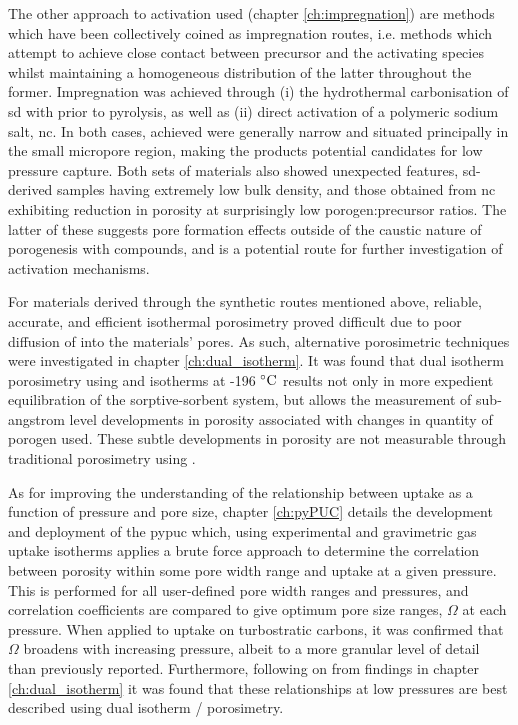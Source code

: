 The other approach to activation used (chapter \ref{ch:impregnation}) are methods which have been collectively coined as impregnation routes, i.e. methods which attempt to achieve close contact between precursor and the activating species whilst maintaining a homogeneous distribution of the latter throughout the former. Impregnation was achieved through (i) the hydrothermal carbonisation of \acrfull{sd} with  prior to pyrolysis, as well as (ii) direct activation of a polymeric sodium salt, \acrfull{nc}. In both cases,  achieved were generally narrow and situated principally in the small \gls{micropore} region, making the products potential candidates for low pressure  capture. Both sets of materials also showed unexpected features, \acrshort{sd}-derived samples having extremely low bulk density, and those obtained from \acrshort{nc} exhibiting reduction in porosity at surprisingly low \gls{porogen}:precursor ratios. The latter of these suggests pore formation effects outside of the caustic nature of \gls{porogenesis} with  compounds, and is a potential route for further investigation of \gls{activation} mechanisms.

For materials derived through the synthetic routes mentioned above, reliable, accurate, and efficient isothermal porosimetry proved difficult due to poor diffusion of  into the materials' pores. As such, alternative porosimetric techniques were investigated in chapter \ref{ch:dual_isotherm}. It was found that dual isotherm porosimetry using  and  isotherms at -196 $\rm ^{\circ}C$ results not only in more expedient equilibration of the sorptive-sorbent system, but allows the measurement of sub-angstrom level developments in porosity associated with changes in quantity of \gls{porogen} used. These subtle developments in porosity are not measurable through traditional porosimetry using . 

As for improving the understanding of the relationship between  uptake as a function of pressure and pore size, chapter \ref{ch:pyPUC} details the development and deployment of the \acrfull{pypuc} which, using experimental  and gravimetric gas uptake isotherms applies a brute force approach to determine the correlation between porosity within some pore width range and  uptake at a given pressure. This is performed for all user-defined pore width ranges and pressures, and correlation coefficients are compared to give optimum pore size ranges, $\Omega$ at each pressure. When applied to  uptake on \glspl{turbostratic carbon}, it was confirmed that $\Omega$ broadens with increasing pressure, albeit to a more granular level of detail than previously reported. Furthermore, following on from findings in chapter \ref{ch:dual_isotherm} it was found that these relationships at low pressures are best described using dual isotherm / porosimetry.